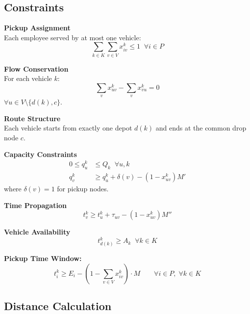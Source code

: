 \documentclass[11pt,a4paper]{article}
\begin{document}
\subsection{Constraints}

\begin{minipage}[t]{0.48\textwidth}
\textbf{Pickup Assignment}\\
Each employee served by at most one vehicle:
\begin{equation}
\sum_{k\in K}\sum_{v\in V} x_{iv}^k \le 1 \;\;\forall i \in P
\end{equation}

\textbf{Flow Conservation}\\
For each vehicle $k$:
\begin{equation}
\sum_{v} x_{uv}^k - \sum_{v} x_{vu}^k = 0
\end{equation}
$\forall u \in V \setminus \{d(k), c\}$.

\textbf{Route Structure}\\
Each vehicle starts from exactly one depot $d(k)$ and ends at the common drop node $c$.
\end{minipage}
\hfill
\begin{minipage}[t]{0.48\textwidth}
\textbf{Capacity Constraints}
\begin{align}
0 \le q_u^k &\le Q_k \;\;\forall u,k \\
q_v^k &\ge q_u^k + \delta(v) - (1{-}x_{uv}^k)M'
\end{align}
where $\delta(v)=1$ for pickup nodes.

\textbf{Time Propagation}
\begin{equation}
t_v^k \ge t_u^k + \tau_{uv} - (1{-}x_{uv}^k)M''
\end{equation}

\textbf{Vehicle Availability}
\begin{equation}
t_{d(k)}^k \ge A_k \;\;\forall k\in K
\end{equation}
\end{minipage}

\vspace{8pt}

\textbf{Pickup Time Window:}
\begin{equation}
t_i^k \ge E_i - (1 - \sum_{v \in V} x_{iv}^k) \cdot M \qquad \forall i \in P,\; \forall k \in K
\end{equation}

\subsection{Distance Calculation}
\end{document}
